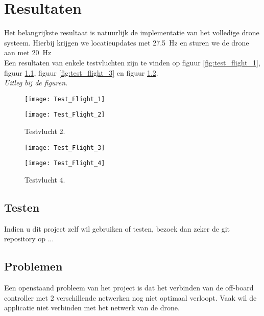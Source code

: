 \chapter{Resultaten}
Het belangrijkste resultaat is natuurlijk de implementatie van het volledige drone systeem. Hierbij krijgen we locatieupdates met \SI{27.5}{\Hz} en sturen we de drone aan met \SI{20}{\Hz}\\

Een resultaten van enkele testvluchten zijn te vinden op figuur \ref{fig:test_flight_1}, figuur \ref{fig:test_flight_2}, figuur \ref{fig:test_flight_3} en figuur \ref{fig:test_flight_4}.\\
\textit{Uitleg bij de figuren.}
\begin{figure}[p]
	\centering
	\texttt{[image: Test\_Flight\_1]}
	\caption[Testvlucht 1]{Testvlucht 1.}
	\label{fig:test_flight_1}
	
	\centering
	\texttt{[image: Test\_Flight\_2]}
	\caption[Testvlucht 2]{Testvlucht 2.}
	\label{fig:test_flight_2}
\end{figure}
\begin{figure}[p]
	\centering
	\texttt{[image: Test\_Flight\_3]}
	\caption[Testvlucht 3]{Testvlucht 3.}
	\label{fig:test_flight_3}

	\texttt{[image: Test\_Flight\_4]}
	\caption[Testvlucht 4]{Testvlucht 4.}
	\label{fig:test_flight_4}
\end{figure}

\section{Testen} \label{sec:test}
Indien u dit project zelf wil gebruiken of testen, bezoek dan zeker de git repository op ...

\section{Problemen} \label{sec:problems}
Een openstaand probleem van het project is dat het verbinden van de off-board controller met 2 verschillende netwerken nog niet optimaal verloopt. Vaak wil de applicatie niet verbinden met het netwerk van de drone.\\

